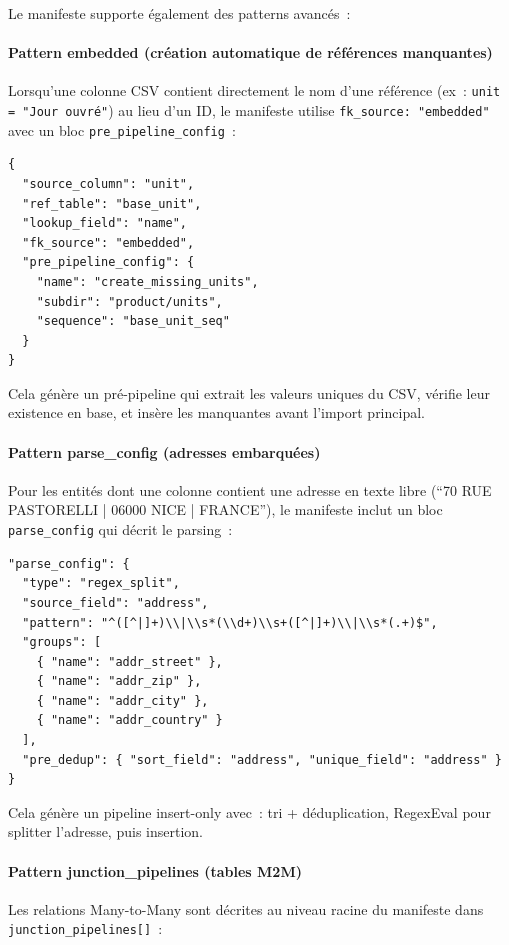 Le manifeste supporte également des patterns avancés~:

\paragraph{Pattern embedded (création automatique de références manquantes)}
Lorsqu'une colonne CSV contient directement le nom d'une référence (ex~: \texttt{unit = "Jour ouvré"}) au lieu d'un ID, le manifeste utilise \texttt{fk\_source: "embedded"} avec un bloc \texttt{pre\_pipeline\_config}~:

\begin{verbatim}
{
  "source_column": "unit",
  "ref_table": "base_unit",
  "lookup_field": "name",
  "fk_source": "embedded",
  "pre_pipeline_config": {
    "name": "create_missing_units",
    "subdir": "product/units",
    "sequence": "base_unit_seq"
  }
}
\end{verbatim}

Cela génère un pré-pipeline qui extrait les valeurs uniques du CSV, vérifie leur existence en base, et insère les manquantes avant l'import principal.

\paragraph{Pattern parse\_config (adresses embarquées)}
Pour les entités dont une colonne contient une adresse en texte libre (``70 RUE PASTORELLI | 06000 NICE | FRANCE''), le manifeste inclut un bloc \texttt{parse\_config} qui décrit le parsing~:

\begin{verbatim}
"parse_config": {
  "type": "regex_split",
  "source_field": "address",
  "pattern": "^([^|]+)\\|\\s*(\\d+)\\s+([^|]+)\\|\\s*(.+)$",
  "groups": [
    { "name": "addr_street" },
    { "name": "addr_zip" },
    { "name": "addr_city" },
    { "name": "addr_country" }
  ],
  "pre_dedup": { "sort_field": "address", "unique_field": "address" }
}
\end{verbatim}

Cela génère un pipeline insert-only avec~: tri + déduplication, RegexEval pour splitter l'adresse, puis insertion.

\paragraph{Pattern junction\_pipelines (tables M2M)}
Les relations Many-to-Many sont décrites au niveau racine du manifeste dans \texttt{junction\_pipelines[]}~:

